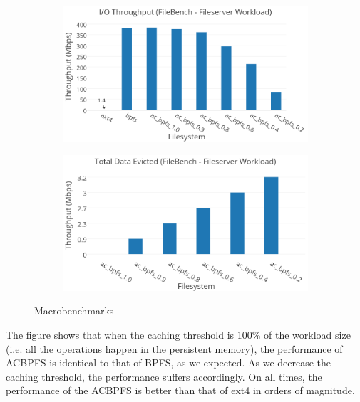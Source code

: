  \begin{figure}[t]\centering
\begin{subfigure}{.46\textwidth}
  \centering
\includegraphics[width=\textwidth]{figs/filebench.png}
\end{subfigure}
\begin{subfigure}{.46\textwidth}
  \centering
  \includegraphics[width=\textwidth]{figs/bench2.png}
\vspace{-0.2in}
\end{subfigure}
\caption{Macrobenchmarks}
\label{fig1:fig1}
\end{figure}

The figure shows that when the caching threshold is 100\% of the workload size (i.e. all the operations happen in the persistent memory), the performance of AC\-BPFS is identical to that of BPFS, as we expected. As we decrease the caching threshold, the performance suffers accordingly. On all times, the performance of the AC\-BPFS is better than that of ext4 in orders of magnitude.
